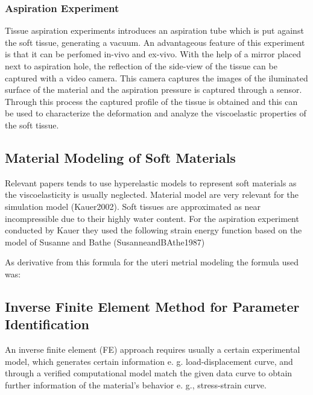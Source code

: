 \subsubsection*{Aspiration Experiment}

Tissue aspiration experiments introduces an aspiration tube which is put against the 
soft tissue, generating a vacuum. An advantageous feature of this experiment is that 
it can be perfomed in-vivo and ex-vivo.
With the help of a mirror placed next to aspiration 
hole, the reflection of the side-view of the tissue can be captured with a video camera.
This camera captures the images of the iluminated surface of the material and the 
aspiration pressure is captured through a sensor. Through this process the captured 
profile of the tissue is obtained and this can be used to characterize the deformation 
and analyze the viscoelastic properties of the soft tissue\cite{Kauer2002}.



\subsection{Material Modeling of Soft Materials}
 
Relevant papers tends to use hyperelastic models to represent soft materials as the viscoelasticity 
is usually neglected. 
Material model are very relevant for the simulation model (Kauer2002).
Soft tissues are approximated as near incompressible due to their highly water content.  
For the aspiration experiment conducted by Kauer they used the following strain energy
function based on the model of Susanne and Bathe (SusanneandBAthe1987)


As derivative from this formula for the uteri metrial modeling the formula used was:

\subsection{Inverse Finite Element Method for Parameter Identification}

An inverse finite element (FE) approach requires usually a certain experimental model,
 which generates certain information e. g. load-displacement curve, and through 
a verified computational model match the given data curve to obtain further information 
of the material's behavior e. g., stress-strain curve.

